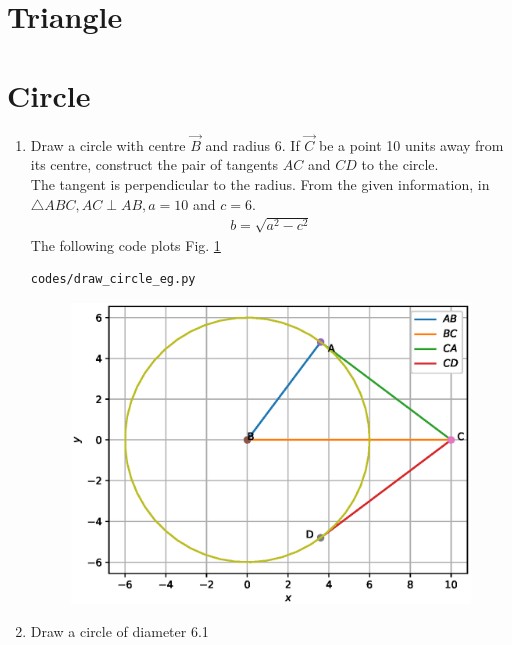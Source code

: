 \documentclass[journal,12pt,twocolumn]{IEEEtran}
\renewcommand\thesection{\arabic{section}}
\begin{document}
\section{Triangle}
\begin{enumerate}[label=\thesection.\arabic*
,ref=\thesection.\theenumi]
\end{enumerate}
\section{Circle}
\begin{enumerate}[label=\thesection.\arabic*
,ref=\thesection.\theenumi]
\item Draw a circle with centre $\vec{B}$ and radius 6.  If $\vec{C}$ be  a point 10 units  away from its 
centre, construct the pair of tangents $AC$ and $CD$ to the 
circle.
\\
\solution The tangent is perpendicular to the radius.
%
From the given information, in $\triangle ABC, AC \perp AB, a = 
10$ and $c = 6$.
\begin{align}
b =  \sqrt{a^2-c^2}
\end{align}
The following code plots Fig. \ref{fig:circle}
\begin{lstlisting}
codes/draw_circle_eg.py
\end{lstlisting}
\begin{figure}[!ht]
\includegraphics[width=\columnwidth]{./figs/circle.eps}
\caption{}
\label{fig:circle}
\end{figure}
\item Draw a circle of diameter 6.1


\end{enumerate}
\end{document}
